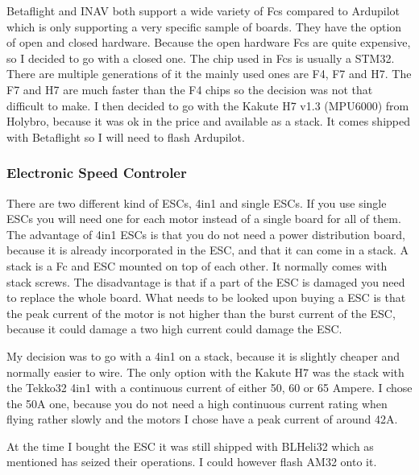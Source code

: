 \documentclass{article}
\begin{document}
	Betaflight and INAV both support a wide variety of Fcs compared to Ardupilot which is only supporting a very specific sample of boards\cite{FcSupport}. They have the option of open and closed hardware. Because the open hardware Fcs are quite expensive, so I decided to go with a closed one. The chip used in Fcs is usually a STM32. There are multiple generations of it the mainly used ones are F4, F7 and H7. The F7 and H7 are much faster than the F4 chips so the decision was not that difficult to make. I then decided to go with the Kakute H7 v1.3 (MPU6000)\cite{KakuteH7} from Holybro, because it was ok in the price and available as a stack. It comes shipped with Betaflight so I will need to flash Ardupilot. 

	\subsubsection[ESC]{Electronic Speed Controler}
	There are two different kind of ESCs, 4in1 and single ESCs. If you use single ESCs you will need one for each motor instead of a single board for all of them. The advantage of 4in1 ESCs is that you do not need a power distribution board, because it is already incorporated in the ESC, and that it can come in a stack. A stack is a Fc and ESC mounted on top of each other. It normally comes with stack screws. The disadvantage is that if a part of the ESC is damaged you need to replace the whole board. What needs to be looked upon buying a ESC is that the peak current of the motor is not higher than the burst current of the ESC, because it could damage a two high current could damage the ESC.
	
	My decision was to go with a 4in1 on a stack, because it is slightly cheaper and normally easier to wire. The only option with the Kakute H7 was the stack with the Tekko32 4in1 with a continuous current of either 50, 60 or 65 Ampere. I chose the 50A\cite{Tekko32} one, because you do not need a high continuous current rating when flying rather slowly and the motors I chose have a peak current of around 42A. 
	
	At the time I bought the ESC it was still shipped with BLHeli32 which as mentioned has seized their operations. I could however flash AM32 onto it.
\end{document}
